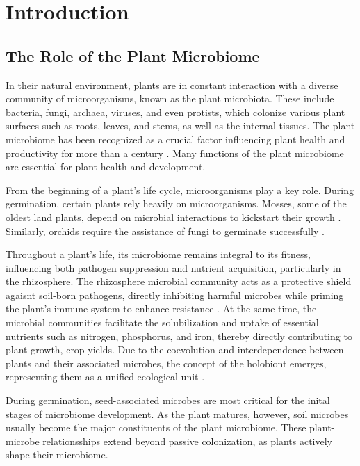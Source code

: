 \section{Introduction}

\subsection{The Role of the Plant Microbiome}
In their natural environment, plants are in constant interaction with a diverse community of microorganisms, known as the plant microbiota. These include bacteria, fungi, archaea, viruses, and even protists, which colonize various plant surfaces such as roots, leaves, and stems, as well as the internal tissues.
The plant microbiome has been recognized as a crucial factor influencing plant health and productivity for more than a century \cite{berg2016Plant}.
Many functions of the plant microbiome are essential for plant health and development. 

From the beginning of a plant's life cycle, microorganisms play a key role. During germination, certain plants rely heavily on microorganisms. Mosses, some of the oldest land plants, depend on microbial interactions to kickstart their growth \cite{hornschuh2006Mossassociated}. 
Similarly, orchids require the assistance of fungi to germinate successfully \cite{jacquemyn2015Mycorrhizal}. 

Throughout a plant’s life, its microbiome remains integral to its fitness, influencing both pathogen suppression and nutrient acquisition, particularly in the rhizosphere.
The rhizosphere microbial community acts as a protective shield agaisnt soil-born pathogens, directly inhibiting harmful microbes while priming the plant's immune system to enhance resistance \cite{berg2016Plant}. At the same time, the microbial communities facilitate the solubilization and uptake of essential nutrients such as nitrogen, phosphorus, and iron, thereby directly contributing to plant growth, crop yields. Due to the coevolution and interdependence between plants and their associated microbes, the concept of the holobiont emerges, representing them as a unified ecological unit \cite{spooren2024PlantDriven}.

During germination, seed-associated microbes are most critical for the inital stages of microbiome development. As the plant matures, however, soil microbes usually become the major constituents of the plant microbiome. 
These plant-microbe relationsships extend beyond passive colonization, as plants actively shape their microbiome. 

